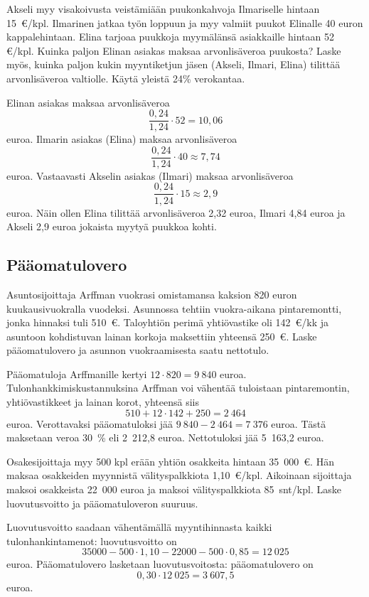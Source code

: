 \documentclass[a4paper,10pt]{article}\usepackage[]{graphicx}\usepackage[]{color}
\begin{document}
\begin{question}
  Akseli myy visakoivusta veistämiään puukonkahvoja Ilmariselle hintaan 15~\euro/kpl. Ilmarinen jatkaa työn loppuun ja myy valmiit puukot Elinalle 40 euron kappalehintaan. Elina tarjoaa puukkoja myymälänsä asiakkaille hintaan 52 \euro/kpl. Kuinka paljon Elinan asiakas maksaa arvonlisäveroa puukosta? Laske myös, kuinka paljon kukin myyntiketjun jäsen (Akseli, Ilmari, Elina) tilittää arvonlisäveroa valtiolle. Käytä yleistä 24\% verokantaa.
\end{question}
\begin{solution}
  \newcommand{\alv}{\frac{0,24}{1,24}}
  Elinan asiakas maksaa arvonlisäveroa 
  \[
    \alv\cdot52 = 10{,}06
  \]
  euroa. Ilmarin asiakas (Elina) maksaa arvonlisäveroa 
  \[
    \alv\cdot40\approx7{,}74
  \]
  euroa. Vastaavasti Akselin asiakas (Ilmari) maksaa arvonlisäveroa
  \[
    \alv\cdot15\approx2{,}9
  \] euroa.
  Näin ollen Elina tilittää arvonlisäveroa 2{,}32 euroa, Ilmari 4{,}84 euroa ja Akseli 2{,}9 euroa jokaista myytyä puukkoa kohti.
\end{solution}

\subsection*{Pääomatulovero}

\begin{question} Asuntosijoittaja Arffman vuokrasi omistamansa kaksion 820 euron kuukausivuokralla vuodeksi. Asunnossa tehtiin vuokra-aikana pintaremontti, jonka hinnaksi tuli 510~\euro. Taloyhtiön perimä yhtiövastike oli 142~\euro/kk ja asuntoon kohdistuvan lainan korkoja maksettiin yhteensä 250~\euro. Laske pääomatulovero ja asunnon vuokraamisesta saatu nettotulo.
\end{question}
\begin{solution}
  Pääomatuloja Arffmanille kertyi \(12\cdot820 = 9~840\) euroa. Tulonhankkimiskustannuksina Arffman voi vähentää tuloistaan pintaremontin, yhtiövastikkeet ja lainan korot, yhteensä siis 
\[
	510 + 12\cdot142 + 250 = 2~464 
\]
euroa. Verottavaksi pääomatuloksi jää \(9~840 - 2~464 = 7~376\) euroa. Tästä maksetaan veroa 30~\% eli 2~212{,}8 euroa. Nettotuloksi jää 5~163{,}2 euroa.
\end{solution}

\begin{question} Osakesijoittaja myy 500 kpl erään yhtiön osakkeita hintaan 35~000~\euro. Hän maksaa osakkeiden myynnistä välityspalkkiota 1,10~\euro/kpl. Aikoinaan sijoittaja maksoi osakkeista 22~000 euroa ja maksoi välityspalkkiota 85~snt/kpl. Laske luovutusvoitto ja pääomatuloveron suuruus.
\end{question}
\begin{solution}
	Luovutusvoitto saadaan vähentämällä myyntihinnasta kaikki tulonhankintamenot: luovutusvoitto on 
\[
	35000-500\cdot1,10-22000-500\cdot0,85 = 12~025
\]
euroa. Pääomatulovero lasketaan luovutusvoitosta: pääomatulovero on 
\[
	0,30\cdot12~025 = 3~607{,}5
\]
euroa.
\end{solution}
\end{document}
